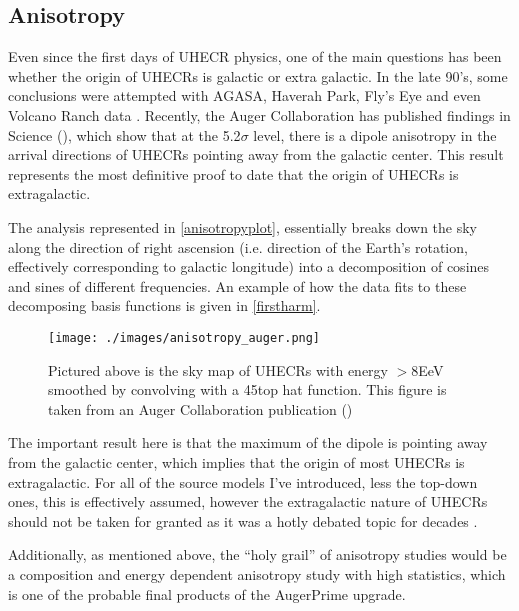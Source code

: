 \subsection{Anisotropy}
Even since the first days of UHECR physics, one of the main questions has been whether the origin of UHECRs is galactic or extra galactic. In the late 90's, some conclusions were attempted with AGASA, Haverah Park, Fly's Eye and even Volcano Ranch data \cite{tds}. Recently, the Auger Collaboration has published findings in Science (\cite{anisotropy}), which show that at the 5.2$\sigma$ level, there is a dipole anisotropy in the arrival directions of UHECRs pointing away from the galactic center. This result represents the most definitive proof to date that the origin of UHECRs is extragalactic. 

The analysis represented in \autoref{anisotropyplot}, essentially breaks down the sky along the direction of right ascension (i.e. direction of the Earth's rotation, effectively corresponding to galactic longitude) into a decomposition of cosines and sines of different frequencies. An example of how the data fits to these decomposing basis functions is given in \autoref{firstharm}.
\begin{figure}[h!]
\begin{center}
\texttt{[image: ./images/anisotropy\_auger.png]}
\caption[Anistropy Sky Map]{Pictured above is the sky map of UHECRs with energy $>8$EeV smoothed by convolving with a 45\degree top hat function. This figure is taken from an Auger Collaboration publication (\cite{anisotropy})}
\label{anisotropyplot}
\end{center}
\end{figure}


The important result here is that the maximum of the dipole is pointing away from the galactic center, which implies that the origin of most UHECRs is extragalactic. For all of the source models I've introduced, less the top-down ones, this is effectively assumed, however the extragalactic nature of UHECRs should not be taken for granted as it was a hotly debated topic for decades \cite{hillas,tds}.

Additionally, as mentioned above, the ``holy grail'' of anisotropy studies would be a composition and energy dependent anisotropy study with high statistics, which is one of the probable final products of the AugerPrime upgrade. 
\newpage
{}

